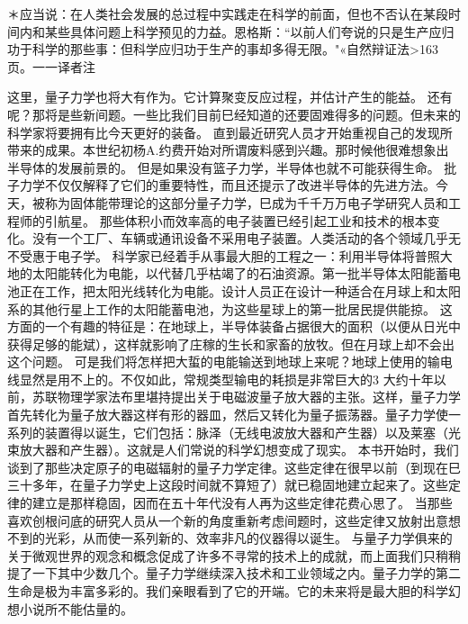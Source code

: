 ＊应当说：在人类社会发展的总过程中实践走在科学的前面，但也不否认在某段时间内和某些具体问题上科学预见的力益。恩格斯：“以前人们夸说的只是生产应归功于科学的那些事：但科学应归功于生产的事却多得无限。"«自然辩证法>163页。一一译者注


这里，量子力学也将大有作为。它计算聚变反应过程，并估计产生的能益。
还有呢？那将是些新间题。一些比我们目前巳经知道的还要固难得多的问题。但未来的科学家将要拥有比今天更好的装备。
直到最近研究人员才开始重视自己的发现所带来的成果。本世纪初杨A.约费开始对所谓废料感到兴趣。那时候他很难想象出半导体的发展前景的。
但是如果没有篮子力学，半导体也就不可能获得生命。
批子力学不仅仅解释了它们的重要特性，而且还提示了改进半导体的先进方法。今天，被称为固体能带理论的这部分量子力学，巳成为千千万万电子学研究人员和工程师的引航星。
那些体积小而效率高的电子装置已经引起工业和技术的根本变化。没有一个工厂、车辆或通讯设备不采用电子装置。人类活动的各个领域几乎无不受惠于电子学。
科学家已经着手从事最大胆的工程之一：利用半导体将普照大地的太阳能转化为电能，以代替几乎枯竭了的石油资源。第一批半导体太阳能蓄电池正在工作，把太阳光线转化为电能。设计人员正在设计一种适合在月球上和太阳系的其他行星上工作的太阳能蓄电池，为这些星球上的第一批居民提供能掠。
这方面的一个有趣的特征是：在地球上，半导体装备占据很大的面积（以便从日光中获得足够的能斌），这样就影响了庄稼的生长和家畜的放牧。但在月球上却不会出这个问题。
可是我们将怎样把大蜇的电能输送到地球上来呢？地球上使用的输电线显然是用不上的。不仅如此，常规类型输电的耗损是非常巨大的3
大约十年以前，苏联物理学家法布里堪持提出关于电磁波量子放大器的主张。这样，量子力学首先转化为量子放大器这样有形的器皿，然后又转化为量子振荡器。量子力学使一系列的装置得以诞生，它们包括：脉泽（无线电波放大器和产生器）以及莱塞（光束放大器和产生器）。这就是人们常说的科学幻想变成了现实。
本书开始时，我们谈到了那些决定原子的电磁辐射的量子力学定律。这些定律在很早以前（到现在巳三十多年，在量子力学史上这段时间就不算短了）就已稳固地建立起来了。这些定律的建立是那样稳固，因而在五十年代没有人再为这些定律花费心思了。
当那些喜欢创根问底的研究人员从一个新的角度重新考虑间题时，这些定律又放射出意想不到的光彩，从而使一系列新的、效率非凡的仪器得以诞生。
与量子力学俱来的关于微观世界的观念和概念促成了许多不寻常的技术上的成就，而上面我们只稍稍提了一下其中少数几个。量子力学继续深入技术和工业领域之内。量子力学的第二生命是极为丰富多彩的。我们亲眼看到了它的开端。它的未来将是最大胆的科学幻想小说所不能估量的。